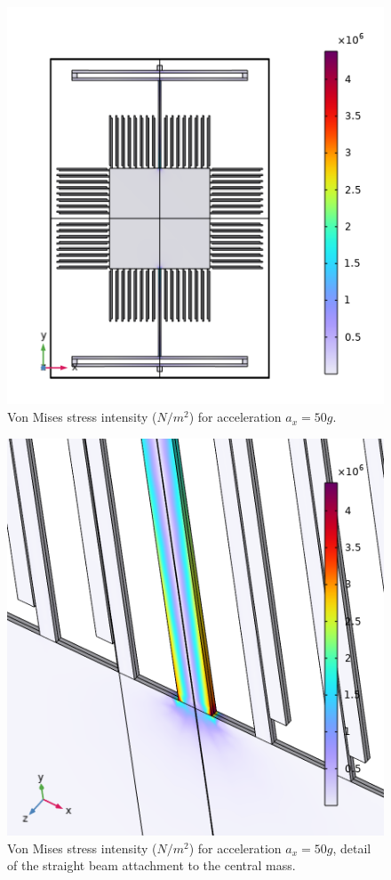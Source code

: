 \documentclass[lettersize,journal]{IEEEtran}
\begin{document}
    \begin{figure}[!h]
        \centering
        \includegraphics[width=1.0\linewidth]{stress_ax}
        \caption{Von Mises stress intensity (\(N/m^2\)) for acceleration \(a_x=50g\).}
        \label{fig:stress_ax}
    \end{figure}
    
    \begin{figure}[!h]
        \centering
        \includegraphics[width=1.0\linewidth]{stress_ax_detail}
        \caption{Von Mises stress intensity (\(N/m^2\)) for acceleration \(a_x=50g\), detail of the straight beam attachment to the central mass.}
        \label{fig:stress_ax_det}
    \end{figure}
    
\end{document}
